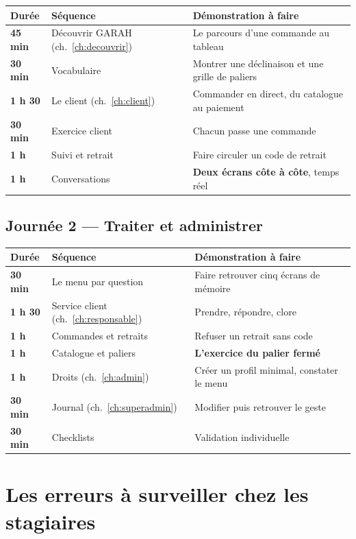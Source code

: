 \documentclass[11pt,a4paper]{report}
\begin{document}
\begin{center}
\begin{tabular}{@{}>{\bfseries}p{2.2cm} p{5.4cm} p{6.8cm}@{}}
\toprule
Durée & Séquence & Démonstration à faire \\
\midrule
45 min & Découvrir GARAH (ch.~\ref{ch:decouvrir}) & Le parcours d'une commande au tableau \\
30 min & Vocabulaire & Montrer une déclinaison et une grille de paliers \\
1 h 30 & Le client (ch.~\ref{ch:client}) & Commander en direct, du catalogue au paiement \\
30 min & Exercice client & Chacun passe une commande \\
1 h & Suivi et retrait & Faire circuler un code de retrait \\
1 h & Conversations & \textbf{Deux écrans côte à côte}, temps réel \\
\bottomrule
\end{tabular}
\end{center}

\subsection*{Journée 2 — Traiter et administrer}

\begin{center}
\begin{tabular}{@{}>{\bfseries}p{2.2cm} p{5.4cm} p{6.8cm}@{}}
\toprule
Durée & Séquence & Démonstration à faire \\
\midrule
30 min & Le menu par question & Faire retrouver cinq écrans de mémoire \\
1 h 30 & Service client (ch.~\ref{ch:responsable}) & Prendre, répondre, clore \\
1 h & Commandes et retraits & Refuser un retrait sans code \\
1 h & Catalogue et paliers & \textbf{L'exercice du palier fermé} \\
1 h & Droits (ch.~\ref{ch:admin}) & Créer un profil minimal, constater le menu \\
30 min & Journal (ch.~\ref{ch:superadmin}) & Modifier puis retrouver le geste \\
30 min & Checklists & Validation individuelle \\
\bottomrule
\end{tabular}
\end{center}

\section{Les erreurs à surveiller chez les stagiaires}
\end{document}
